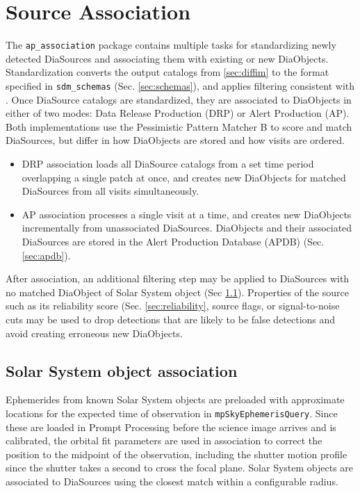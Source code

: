 \section{Source Association}
\label{sec:association}

The \texttt{ap\_association} package contains multiple tasks for standardizing newly detected DiaSources and associating them with existing or new DiaObjects.
Standardization converts the output catalogs from \ref{sec:diffim} to the format specified in \texttt{sdm\_schemas} (Sec. \ref{sec:schemas}), and applies filtering consistent with \citep{DMTN-199}.
Once DiaSource catalogs are standardized, they are associated to DiaObjects in either of two modes: Data Release Production (DRP) or Alert Production (AP).
Both implementations use the Pessimistic Pattern Matcher B \citep{DMTN-031} to score and match DiaSources, but differ in how DiaObjects are stored and how visits are ordered.

\begin{itemize}
\item DRP association loads all DiaSource catalogs from a set time period overlapping a single patch at once, and creates new DiaObjects for matched DiaSources from all visits simultaneously.
\item AP association processes a single visit at a time, and creates new DiaObjects incrementally from unassociated DiaSources.
DiaObjects and their associated DiaSources are stored in the Alert Production Database (APDB) (Sec. \ref{sec:apdb}).
\end{itemize}

After association, an additional filtering step may be applied to DiaSources with no matched DiaObject of Solar System object (Sec \ref{sec:solar}).
Properties of the source such as its reliability score (Sec. \ref{sec:reliability}, source flags, or signal-to-noise cuts may be used to drop detections that are likely to be false detections and avoid creating erroneous new DiaObjects.

\subsection{Solar System object association}
\label{sec:solar}

Ephemerides from known Solar System objects are preloaded with approximate locations for the expected time of observation in \texttt{mpSkyEphemerisQuery}.
Since these are loaded in Prompt Processing before the science image arrives and is calibrated, the orbital fit parameters are used in association to correct the position to the midpoint of the observation, including the shutter motion profile since the shutter takes a second to cross the focal plane.
Solar System objects are associated to DiaSources using the closest match within a configurable radius.


